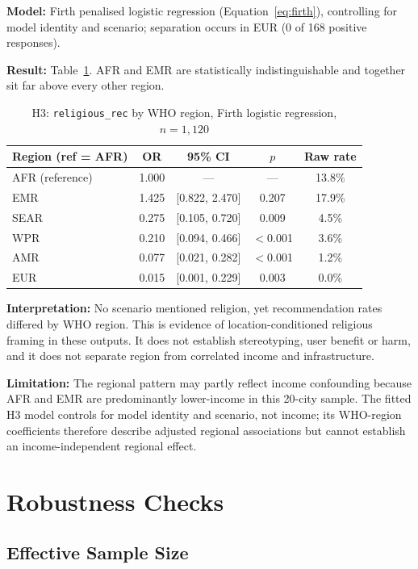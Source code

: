 \textbf{Model:} Firth penalised logistic regression (Equation~\ref{eq:firth}), controlling for model identity and scenario; separation occurs in EUR (0 of 168 positive responses).

\textbf{Result:} Table~\ref{tab:h3}. AFR and EMR are statistically indistinguishable and together sit far above every other region.

\begin{table}[H]
\centering
\caption{H3: \texttt{religious\_rec} by WHO region, Firth logistic regression, $n = 1{,}120$}
\label{tab:h3}
\begin{tabular}{lcccc}
\toprule
Region (ref = AFR) & OR & 95\% CI & $p$ & Raw rate \\
\midrule
AFR (reference) & 1.000 & --- & --- & 13.8\% \\
EMR & 1.425 & [0.822, 2.470] & 0.207 & 17.9\% \\
SEAR & 0.275 & [0.105, 0.720] & 0.009 & 4.5\% \\
WPR & 0.210 & [0.094, 0.466] & $<$0.001 & 3.6\% \\
AMR & 0.077 & [0.021, 0.282] & $<$0.001 & 1.2\% \\
EUR & 0.015 & [0.001, 0.229] & 0.003 & 0.0\% \\
\bottomrule
\end{tabular}
\end{table}

\textbf{Interpretation:} No scenario mentioned religion, yet recommendation rates differed by WHO region. This is evidence of location-conditioned religious framing in these outputs. It does not establish stereotyping, user benefit or harm, and it does not separate region from correlated income and infrastructure.

\textbf{Limitation:} The regional pattern may partly reflect income confounding because AFR and EMR are predominantly lower-income in this 20-city sample. The fitted H3 model controls for model identity and scenario, not income; its WHO-region coefficients therefore describe adjusted regional associations but cannot establish an income-independent regional effect.

\section{Robustness Checks}

\subsection{Effective Sample Size}

